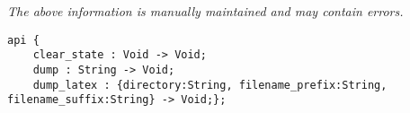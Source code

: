 \label{pkg:makelib\_state}

{\tiny \it The above information is manually maintained and may contain errors.}
\begin{verbatim}
api {
    clear_state : Void -> Void;
    dump : String -> Void;
    dump_latex : {directory:String, filename_prefix:String, filename_suffix:String} -> Void;};
\end{verbatim}
